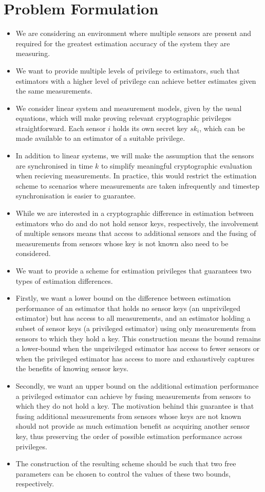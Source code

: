 \documentclass[conference]{IEEEtran}
\begin{document}
\section{Problem Formulation}\label{sec:prob}
\begin{itemize}
  \item We are considering an environment where multiple sensors are present and required for the greatest estimation accuracy of the system they are measuring.
  \item We want to provide multiple levels of privilege to estimators, such that estimators with a higher level of privilege can achieve better estimates given the same measurements.
  \item We consider linear system and measurement models, given by the usual equations, which will make proving relevant cryptographic privileges straightforward. Each sensor $i$ holds its own secret key $sk_i$, which can be made available to an estimator of a suitable privilege.
  \item In addition to linear systems, we will make the assumption that the sensors are synchronised in time $k$ to simplify meaningful cryptographic evaluation when recieving measurements. In practice, this would restrict the estimation scheme to scenarios where measurements are taken infrequently and timestep synchronisation is easier to guarantee.
  \item While we are interested in a cryptographic difference in estimation between estimators who do and do not hold sensor keys, respectively, the involvement of multiple sensors means that access to additional sensors and the fusing of measurements from sensors whose key is not known also need to be considered.
  \item We want to provide a scheme for estimation privileges that guarantees two types of estimation differences.
  \item Firstly, we want a lower bound on the difference between estimation performance of an estimator that holds no sensor keys (an unprivileged estimator) but has access to all measurements, and an estimator holding a subset of sensor keys (a privileged estimator) using only measurements from sensors to which they hold a key. This construction means the bound remains a lower-bound when the unprivileged estimator has access to fewer sensors or when the privileged estimator has access to more and exhaustively captures the benefits of knowing sensor keys.
  \item Secondly, we want an upper bound on the additional estimation performance a privileged estimator can achieve by fusing measurements from sensors to which they do not hold a key. The motivation behind this guarantee is that fusing additional measurements from sensors whose keys are not known should not provide as much estimation benefit as acquiring another sensor key, thus preserving the order of possible estimation performance across privileges.
  \item The construction of the resulting scheme should be such that two free parameters can be chosen to control the values of these two bounds, respectively.
\end{itemize}
\end{document}
